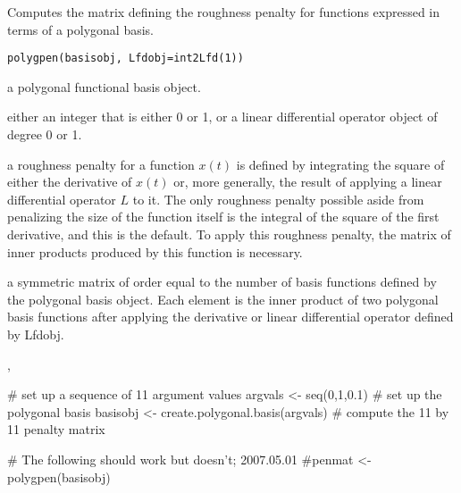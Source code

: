 \documentclass{article}
\begin{document}
\begin{Description}\relax
Computes the matrix defining the roughness penalty for functions
expressed in terms of a polygonal basis.
\end{Description}
\begin{Usage}
\begin{verbatim}
polygpen(basisobj, Lfdobj=int2Lfd(1))
\end{verbatim}
\end{Usage}
\begin{Arguments}
\begin{ldescription}
\item[\code{basisobj}] a polygonal functional basis object.

\item[\code{Lfdobj}] either an integer that is either 0 or 1, or a
linear differential operator object of degree 0 or 1.

\end{ldescription}
\end{Arguments}
\begin{Details}\relax
a roughness penalty for a function $ x(t) $ is defined by
integrating the square of either the derivative of  $ x(t) $ or,
more generally, the result of applying a linear differential operator
$ L $ to it.  The only roughness penalty possible aside from
penalizing the size of the function itself is the integral
of the square of the first derivative, and
this is the default. To apply this roughness penalty, the matrix of
inner products produced by this function is necessary.
\end{Details}
\begin{Value}
a symmetric matrix of order equal to the number of basis functions
defined by the polygonal basis object.  Each element is the inner product
of two polygonal basis functions after applying the derivative or linear
differential operator defined by Lfdobj.
\end{Value}
\begin{SeeAlso}\relax
{}, 
\end{SeeAlso}
\begin{Examples}
\begin{ExampleCode}

#  set up a sequence of 11 argument values
argvals <- seq(0,1,0.1)
#  set up the polygonal basis
basisobj <- create.polygonal.basis(argvals)
#  compute the 11 by 11 penalty matrix

# The following should work but doesn't;  2007.05.01
#penmat <- polygpen(basisobj)

\end{ExampleCode}
\end{Examples}
\end{document}
